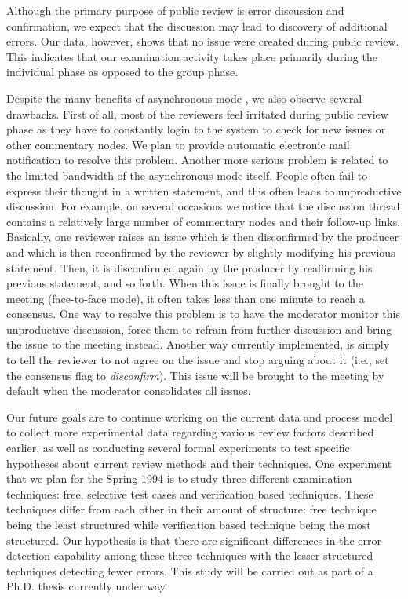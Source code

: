 Although the primary purpose of public review is error discussion and
confirmation, we expect that the discussion may lead to discovery of
additional errors\cite{Doolan92}. Our data, however, shows that no
issue were created during public review.  This indicates that our
examination activity takes place primarily during the individual phase
as opposed to the group phase.

Despite the many benefits of asynchronous mode
\cite{Johnson93,Johnson93b}, we also observe several drawbacks.  First
of all, most of the reviewers feel irritated during public review
phase as they have to constantly login to the system to check for new
issues or other commentary nodes. We plan to provide automatic
electronic mail notification to resolve this problem. Another more
serious problem is related to the limited bandwidth of the
asynchronous mode itself. People often fail to express their thought
in a written statement, and this often leads to unproductive
discussion. For example, on several occasions we notice that the
discussion thread contains a relatively large number of commentary
nodes and their follow-up links. Basically, one reviewer raises an
issue which is then disconfirmed by the producer and which is then
reconfirmed by the reviewer by slightly modifying his previous
statement. Then, it is disconfirmed again by the producer by
reaffirming his previous statement, and so forth. When this issue is
finally brought to the meeting (face-to-face mode), it often takes
less than one minute to reach a consensus.  One way to resolve this
problem is to have the moderator monitor this unproductive discussion,
force them to refrain from further discussion and bring the issue to
the meeting instead. Another way currently implemented, is simply to
tell the reviewer to not agree on the issue and stop arguing about it
(i.e., set the consensus flag to {\it disconfirm}). This issue will be
brought to the meeting by default when the moderator consolidates all
issues.

Our future goals are to continue working on the current data and
process model to collect more experimental data regarding various
review factors described earlier, as well as conducting several formal
experiments to test specific hypotheses about current review methods
and their techniques. One experiment that we plan for the Spring 1994
is to study three different examination techniques: free, selective
test cases and verification based techniques. These techniques differ
from each other in their amount of structure: free technique being the
least structured while verification based technique being the most
structured.  Our hypothesis is that there are significant differences
in the error detection capability among these three techniques with
the lesser structured techniques detecting fewer errors. This study
will be carried out as part of a Ph.D. thesis currently under way.

